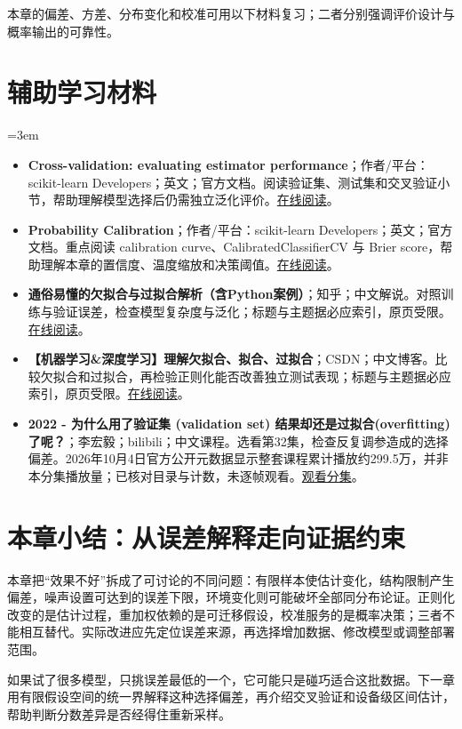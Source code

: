 本章的偏差、方差、分布变化和校准可用以下材料复习；二者分别强调评价设计与概率输出的可靠性。
\section*{辅助学习材料}
\begingroup
\emergencystretch=3em
\begin{itemize}
\item \textbf{Cross-validation: evaluating estimator performance}；作者/平台：scikit-learn Developers；英文；官方文档。阅读验证集、测试集和交叉验证小节，帮助理解模型选择后仍需独立泛化评价。\href{https://scikit-learn.org/stable/modules/cross\_validation.html}{在线阅读}。
\item \textbf{Probability Calibration}；作者/平台：scikit-learn Developers；英文；官方文档。重点阅读 calibration curve、CalibratedClassifierCV 与 Brier score，帮助理解本章的置信度、温度缩放和决策阈值。\href{https://scikit-learn.org/stable/modules/calibration.html}{在线阅读}。
\item \textbf{通俗易懂的欠拟合与过拟合解析（含Python案例）}；知乎；中文解说。对照训练与验证误差，检查模型复杂度与泛化；标题与主题据必应索引，原页受限。\href{https://zhuanlan.zhihu.com/p/1903580134293897493}{在线阅读}。
\item \textbf{【机器学习\&深度学习】理解欠拟合、拟合、过拟合}；CSDN；中文博客。比较欠拟合和过拟合，再检验正则化能否改善独立测试表现；标题与主题据必应索引，原页受限。\href{https://blog.csdn.net/qq\_62223405/article/details/149040906}{在线阅读}。
\item \textbf{2022 - 为什么用了验证集 (validation set) 结果却还是过拟合(overfitting)了呢？}；李宏毅；bilibili；中文课程。选看第32集，检查反复调参造成的选择偏差。2026年10月4日官方公开元数据显示整套课程累计播放约299.5万，并非本分集播放量；已核对目录与计数，未逐帧观看。\href{https://www.bilibili.com/video/BV1Wv411h7kN/?p=32}{观看分集}。
\end{itemize}
\endgroup
\section{本章小结：从误差解释走向证据约束}
本章把“效果不好”拆成了可讨论的不同问题：有限样本使估计变化，结构限制产生偏差，噪声设置可达到的误差下限，环境变化则可能破坏全部同分布论证。正则化改变的是估计过程，重加权依赖的是可迁移假设，校准服务的是概率决策；三者不能相互替代。实际改进应先定位误差来源，再选择增加数据、修改模型或调整部署范围。

如果试了很多模型，只挑误差最低的一个，它可能只是碰巧适合这批数据。下一章用有限假设空间的统一界解释这种选择偏差，再介绍交叉验证和设备级区间估计，帮助判断分数差异是否经得住重新采样。
